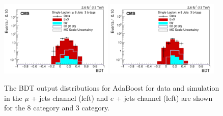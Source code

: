 \begin{figure}[ht!]
    \includegraphics[width=0.48\textwidth]{images/Run2/BDT_Mu29Aug400trees_5MinNodeSize_20nCuts_3MaxDepth_5adaboostbeta_adaBoost_alphaSTune_noMinEvents8nJets3nMtags_StackLogY.pdf}
    \includegraphics[width=0.48\textwidth]{images/Run2/BDT_El29Aug400trees_5MinNodeSize_20nCuts_3MaxDepth_5adaboostbeta_adaBoost_alphaSTune_noMinEvents8nJets3nMtags_StackLogY.pdf} 
    \caption{The BDT output distributions for AdaBoost for data and simulation in the $\mu$ + jets channel (left) and $e$ + jets channel (left) are shown for the 8 \njets category and 3 \nMtags category.}
    \label{fig:BDT_Mu29Aug400trees_5MinNodeSize_20nCuts_3MaxDepth_5adaboostbeta_adaBoost_alphaSTune_noMinEvents83}
\end{figure}

